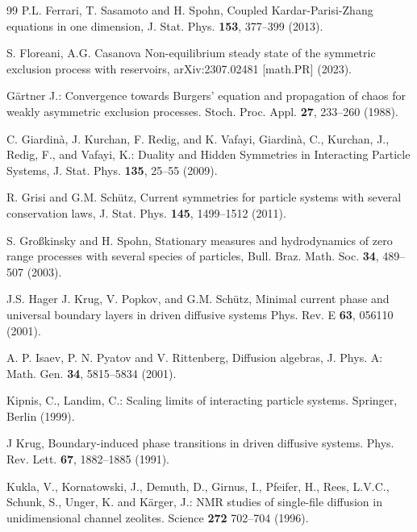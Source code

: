 \documentclass[12pt]{article}
\begin{document}
\begin{thebibliography}{99}
P.L. Ferrari, T. Sasamoto and H. Spohn,
Coupled Kardar-Parisi-Zhang equations in one dimension, 
J. Stat. Phys.  \textbf{153}, 377--399 (2013).

 S. Floreani, A.G. Casanova Non-equilibrium steady state of the symmetric exclusion process with reservoirs, arXiv:2307.02481 [math.PR] (2023).

G\"artner J.: 
Convergence towards Burgers’ equation and propagation of chaos for weakly asymmetric exclusion processes. 
Stoch. Proc. Appl. \textbf{27}, 233--260 (1988).

 C. Giardin\`a, J. Kurchan, F. Redig,  and K. Vafayi,
Giardin\`a, C., Kurchan, J., Redig, F., and Vafayi, K.: Duality and Hidden Symmetries in Interacting Particle Systems, J. Stat. Phys. \textbf{135}, 25--55 (2009).

R. Grisi and G.M. Sch\"utz,
Current symmetries for particle systems with several conservation laws,
J. Stat. Phys. \textbf{145}, 1499--1512 (2011).

S. Gro{\ss}kinsky and H. Spohn,
Stationary measures and hydrodynamics of zero range processes with several
species of particles,
Bull. Braz. Math. Soc. \textbf{34}, 489--507 (2003).

J.S. Hager J. Krug, V. Popkov, and G.M. Sch\"utz,
Minimal current phase and universal boundary layers in driven 
diffusive systems
Phys. Rev. E \textbf{63}, 056110 (2001).

A. P. Isaev, P. N. Pyatov and V. Rittenberg,
Diffusion algebras,
J. Phys. A: Math. Gen. \textbf{34}, 5815--5834 (2001).


Kipnis, C., Landim, C.:
Scaling limits of interacting particle systems.
Springer, Berlin (1999).

J Krug, 
Boundary-induced phase transitions in driven diffusive systems. 
Phys. Rev. Lett. \textbf{67}, 1882--1885 (1991).

 Kukla, V., Kornatowski, J., Demuth, D., Girnus, I., Pfeifer, H., Rees, L.V.C., Schunk, S., Unger, K. and K\"arger, J.:  NMR studies of single-file diffusion in unidimensional channel zeolites. Science \textbf{272} 702--704 (1996).


\end{thebibliography}
\end{document}
